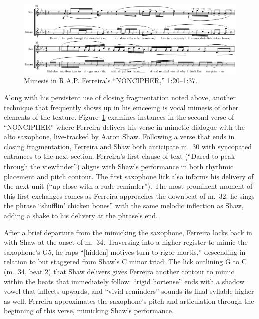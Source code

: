     \begin{figure}[!ht]
        \centering
        \includegraphics[width=\textwidth]{images/figures/chp 03/120137nonciphermimesis.pdf}
        \caption{Mimesis in R.A.P. Ferreira's ``NONCIPHER,'' 1:20--1:37.}
        \label{fig:rorymimesis}
    \end{figure}


Along with his persistent use of closing fragmentation noted above, another technique that frequently shows 
up in his emceeing is vocal mimesis of other elements of the texture. Figure~\ref{fig:rorymimesis} examines
instances in the second verse of ``NONCIPHER'' where Ferreira delivers his verse in mimetic dialogue with the
alto saxophone, live-tracked by Aaron Shaw. Following a verse that ends in closing fragmentation, Ferreira and
Shaw both anticipate m.~30 with syncopated entrances to the next section. Ferreira's first clause of text 
(``Dared to peak through the viewfinder'') aligns with Shaw's performance in both rhythmic placement and pitch 
contour. The first saxophone lick also informs his delivery of the next unit (``up close with a rude reminder'').
The most prominent moment of this first exchanges comes as Ferreira approaches the downbeat of m.~32: he sings
the phrase ``shufflin' chicken bones'' with the same melodic inflection as Shaw, adding a shake to his delivery
at the phrase's end.

After a brief departure from the mimicking the saxophone, Ferreira locks back in with Shaw at the onset of m.~34.
Traversing into a higher register to mimic the saxophone's G5, he raps ``[hidden] motives turn to rigor mortis,''
descending in relation to but staggered from Shaw's C minor triad. The lick outlining G to C (m.~34, beat 2) that
Shaw delivers gives Ferreira another contour to mimic within the beats that immediately follow: ``rigid hortense''
ends with a shadow vowel that inflects upwards, and ``vivid reminders'' sounds its final syllable higher as well.
Ferreira approximates the saxophone's pitch and articulation through the beginning of this verse, mimicking Shaw's
performance.

